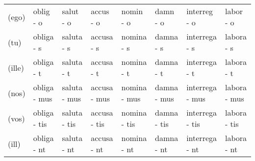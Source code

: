 \documentclass[a4paper, landscape]{article}
\begin{document}
\begin{landscape}
\begin{table}[]
\begin{tabular}{llllllll}
	(ego)	& oblig  - o	& salut	 - o	& accus  - o	& nomin  - o	& damn  - o		& interreg  - o		& labor - o \\
    (tu)	& obliga - s	& saluta - s	& accusa - s	& nomina - s	& damna - s		& interrega - s		& labora - s \\
	(ille)	& obliga - t	& saluta - t	& accusa - t	& nomina - t	& damna - t		& interrega - t		& labora - t \\
	(nos)	& obliga - mus	& saluta - mus	& accusa - mus	& nomina - mus	& damna - mus	& interrega - mus	& labora - mus \\
    (vos)	& obliga - tis	& saluta - tis	& accusa - tis	& nomina - tis	& damna - tis	& interrega - tis	& labora - tis \\
    (ill)	& obliga - nt	& saluta - nt	& accusa - nt	& nomina - nt	& damna - nt	& interrega - nt	& labora - nt \\


\end{tabular}
\end{table}
\end{landscape}
\end{document}
